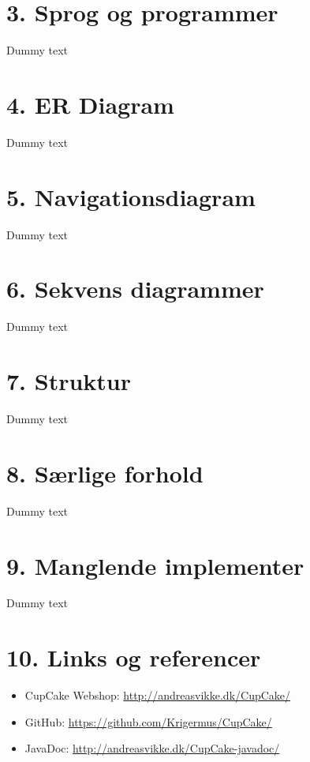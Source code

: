 \documentclass[11pt]{report}
\begin{document}
\newpage

\chapter*{3. Sprog og programmer}
Dummy text

\newpage

\chapter*{4. ER Diagram}
Dummy text

\newpage

\chapter*{5. Navigationsdiagram}
Dummy text

\newpage

\chapter*{6. Sekvens diagrammer}
Dummy text

\newpage

\chapter*{7. Struktur}
Dummy text

\newpage

\chapter*{8. Særlige forhold}
Dummy text

\newpage

\chapter*{9. Manglende implementer}
Dummy text

\newpage

\chapter*{10. Links og referencer}
\begin{itemize}
  \item CupCake Webshop: \url{http://andreasvikke.dk/CupCake/}
  \item GitHub: \url{https://github.com/Krigermus/CupCake/}
  \item JavaDoc: \url{http://andreasvikke.dk/CupCake-javadoc/}
\end{itemize}

 \newpage
\end{document}
